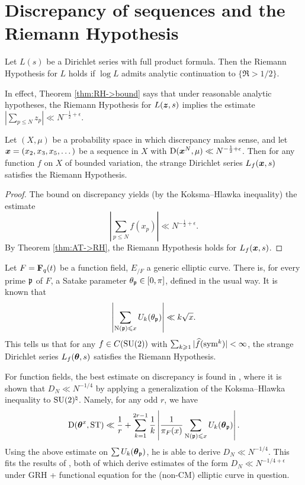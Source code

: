\section{Discrepancy of sequences and the Riemann Hypothesis}

\begin{definition}
Let $L(s)$ be a Dirichlet series with full product formula. Then the Riemann 
Hypothesis for $L$ holds if $\log L$ admits analytic continuation 
to $\{\Re > 1/2\}$. 
\end{definition}

In effect, Theorem \ref{thm:RH->bound} says that under reasonable analytic 
hypotheses, the Riemann Hypothesis for $L({\boldsymbol z},s)$ implies the estimate 
$|\sum_{p\leqslant N} z_p| \ll N^{-\frac 1 2+\epsilon}$. 

\begin{theorem}
Let $(X,\mu)$ be a probability space in which discrepancy makes sense, and let 
${\boldsymbol x}=(x_2,x_3,x_5,\dots)$ be a sequence in $X$ with 
$\operatorname{D}({\boldsymbol x}^N,\mu) \ll N^{-\frac 1 2+\epsilon}$. Then for any function $f$ on 
$X$ of bounded variation, the strange Dirichlet series $L_f({\boldsymbol x},s)$ satisfies 
the Riemann Hypothesis. 
\end{theorem}
\begin{proof}
The bound on discrepancy yields (by the Koksma--Hlawka inequality) the estimate 
\[
	\left| \sum_{p\leqslant N} f(x_p)\right| \ll N^{-\frac 1 2+\epsilon} .
\]
By Theorem \ref{thm:AT->RH}, the Riemann Hypothesis holds for $L_f({\boldsymbol x},s)$. 
\end{proof}

Let $F = \mathbf{F}_q(t)$ be a function field, $E_{/F}$ a generic elliptic curve. 
There is, for every prime $\mathfrak{p}$ of $F$, a Satake parameter 
$\theta_{\mathfrak{p}} \in [0,\pi]$, defined in the usual way. It is known 
\cite[Ch.~3]{katz-1988} that
\[
	\left|\sum_{\operatorname{N}(\mathfrak{p}) \leqslant x} U_k(\theta_{\mathfrak{p}}) \right| \ll k \sqrt{x} .
\]
This tells us that for any $f\in C(\operatorname{SU}(2))$ with 
$\sum_{k\geqslant 1} |\widehat f(\operatorname{sym}^k)|<\infty$, the strange Dirichlet 
series $L_f({\boldsymbol\theta},s)$ satisfies the Riemann Hypothesis. 

For function fields, the best estimate on discrepancy is found in 
\cite{niederreiter-1991}, where it is shown that $D_N \ll N^{-1/4}$ 
by applying a generalization of the Koksma--Hlawka inequality to 
$\operatorname{SU}(2)^\natural$. Namely, for any odd $r$, we have 
\[
	\operatorname{D}({\boldsymbol\theta}^x,\mathrm{ST}) \ll \frac 1 r + \sum_{k=1}^{2 r -1} \frac 1 k \left| \frac{1}{\pi_F(x)} \sum_{\operatorname{N}(\mathfrak{p})\leqslant x} U_k({\boldsymbol\theta}_{\mathfrak{p}})\right| .
\]
Using the above estimate on $\sum U_k({\boldsymbol\theta}_{\mathfrak{p}})$, he is able to derive 
$D_N \ll N^{-1/4}$. This fits the results of 
\cite{bucar-kedlaya-2015,rouse-thorner-2016}, both of which derive estimates 
of the form $D_N \ll N^{-1/4+\epsilon}$ under GRH + functional equation for 
the (non-CM) elliptic curve in question. 
